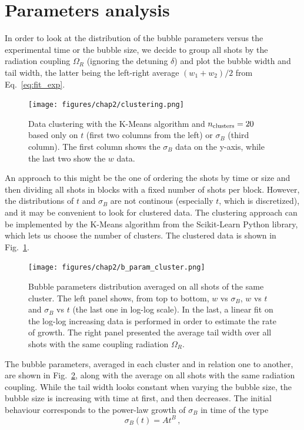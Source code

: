 \section{Parameters analysis}
In order to look at the distribution of the bubble parameters versus the experimental time or the bubble size, we decide to group all shots by the radiation coupling $\Omega_R$ (ignoring the detuning $\delta$) and plot the bubble width and tail width, the latter being the left-right average $(w_1+w_2)/2$ from Eq.\ \eqref{eq:fit_exp}. 
\begin{figure}[h!]
    \centering
    \texttt{[image: figures/chap2/clustering.png]}
    \caption{Data clustering with the K-Means algorithm and $n_{\rm clusters} = 20$ based only on $t$ (first two columns from the left) or $\sigma_B$ (third column). The first column shows the $\sigma_B$ data on the y-axis, while the last two show the $w$ data.}
    \label{fig:clust}
\end{figure} 
An approach to this might be the one of ordering the shots by time or size and then dividing all shots in blocks with a fixed number of shots per block. However, the distributions of $t$ and $\sigma_B$ are not continous (especially $t$, which is discretized), and it may be convenient to look for clustered data. 
The clustering approach can be implemented by the K-Means algorithm from the Scikit-Learn Python library, which lets us choose the number of clusters. The clustered data is shown in Fig.\ \ref{fig:clust}. 
\begin{figure}[h!]
    \centering
    \texttt{[image: figures/chap2/b\_param\_cluster.png]}
    \caption{Bubble parameters distribution averaged on all shots of the same cluster. The left panel shows, from top to bottom, $w$ vs $\sigma_B$, $w$ vs $t$ and $\sigma_B$ vs $t$ (the last one in log-log scale). In the last, a linear fit on the log-log increasing data is performed in order to estimate the rate of growth. The right panel presented the average tail width over all shots with the same coupling radiation $\Omega_R$.}
    \label{fig:b_param}
\end{figure}
The bubble parameters, averaged in each cluster and in relation one to another, are shown in Fig.\ \ref{fig:b_param}, along with the average on all shots with the same radiation coupling. While the tail width looks constant when varying the bubble size, the bubble size is increasing with time at first, and then decreases. The initial behaviour corresponds to the power-law growth of $\sigma_B$ in time of the type
\[
    \sigma_B(t) = At^B\, , 
\]
